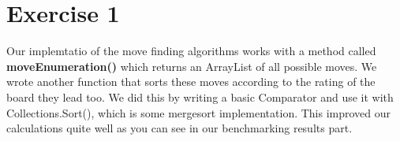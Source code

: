 \section{Exercise 1}
Our implemtatio of the move finding algorithms works with a method called \textbf{moveEnumeration()} which returns an ArrayList of all possible moves. We wrote another function that sorts these moves according to the rating of the board they lead too. We did this by writing a basic Comparator and use it with Collections.Sort(), which is some mergesort implementation. This improved our calculations quite well as you can see in our benchmarking results part.